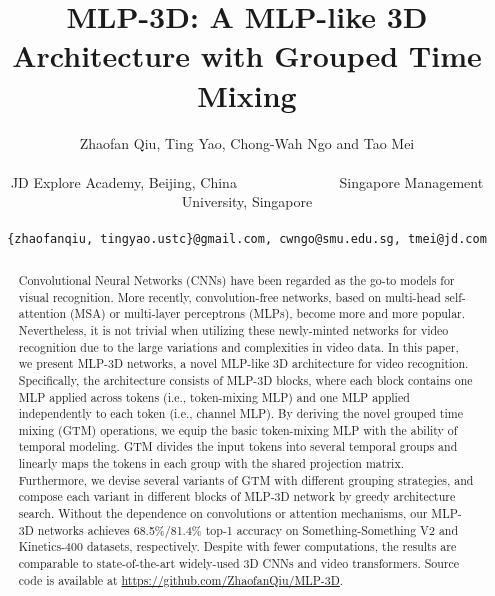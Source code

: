 \documentclass[10pt,twocolumn,letterpaper]{article}
\begin{document}
\title{MLP-3D: A MLP-like 3D Architecture with Grouped Time Mixing}

\author{Zhaofan Qiu, Ting Yao, Chong-Wah Ngo and Tao Mei\\
\parbox{40em}{\centering  JD Explore Academy, Beijing, China~~~~~~~~~~~~~~ Singapore Management University, Singapore}\\
{\tt\small \{zhaofanqiu, tingyao.ustc\}@gmail.com, cwngo@smu.edu.sg, tmei@jd.com}
}
\maketitle

\begin{abstract}
Convolutional Neural Networks (CNNs) have been regarded as the go-to models for visual recognition. More recently, convolution-free networks, based on multi-head self-attention (MSA) or multi-layer perceptrons (MLPs), become more and more popular. Nevertheless, it is not trivial when utilizing these newly-minted networks for video recognition due to the large variations and complexities in video data. In this paper, we present MLP-3D networks, a novel MLP-like 3D architecture for video recognition. Specifically, the architecture consists of MLP-3D blocks, where each block contains one MLP applied across tokens (i.e., token-mixing MLP) and one MLP applied independently to each token (i.e., channel MLP). By deriving the novel grouped time mixing (GTM) operations, we equip the basic token-mixing MLP with the ability of temporal modeling. GTM divides the input tokens into several temporal groups and linearly maps the tokens in each group with the shared projection matrix. Furthermore, we devise several variants of GTM with different grouping strategies, and compose each variant in different blocks of MLP-3D network by greedy architecture search. Without the dependence on convolutions or attention mechanisms, our MLP-3D networks achieves 68.5\%/81.4\% top-1 accuracy on Something-Something V2 and Kinetics-400 datasets, respectively. Despite with fewer computations, the results are comparable to state-of-the-art widely-used 3D CNNs and video transformers. Source code is available at \href{https://github.com/ZhaofanQiu/MLP-3D}{https://github.com/ZhaofanQiu/MLP-3D}.
\end{abstract}
\end{document}
